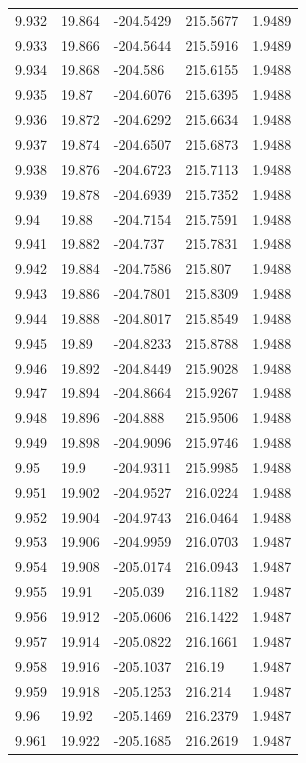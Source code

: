 \begin{tabular}{lllll}
9.932 & 19.864 & -204.5429 & 215.5677 & 1.9489 \\
9.933 & 19.866 & -204.5644 & 215.5916 & 1.9489 \\
9.934 & 19.868 & -204.586 & 215.6155 & 1.9488 \\
9.935 & 19.87 & -204.6076 & 215.6395 & 1.9488 \\
9.936 & 19.872 & -204.6292 & 215.6634 & 1.9488 \\
9.937 & 19.874 & -204.6507 & 215.6873 & 1.9488 \\
9.938 & 19.876 & -204.6723 & 215.7113 & 1.9488 \\
9.939 & 19.878 & -204.6939 & 215.7352 & 1.9488 \\
9.94 & 19.88 & -204.7154 & 215.7591 & 1.9488 \\
9.941 & 19.882 & -204.737 & 215.7831 & 1.9488 \\
9.942 & 19.884 & -204.7586 & 215.807 & 1.9488 \\
9.943 & 19.886 & -204.7801 & 215.8309 & 1.9488 \\
9.944 & 19.888 & -204.8017 & 215.8549 & 1.9488 \\
9.945 & 19.89 & -204.8233 & 215.8788 & 1.9488 \\
9.946 & 19.892 & -204.8449 & 215.9028 & 1.9488 \\
9.947 & 19.894 & -204.8664 & 215.9267 & 1.9488 \\
9.948 & 19.896 & -204.888 & 215.9506 & 1.9488 \\
9.949 & 19.898 & -204.9096 & 215.9746 & 1.9488 \\
9.95 & 19.9 & -204.9311 & 215.9985 & 1.9488 \\
9.951 & 19.902 & -204.9527 & 216.0224 & 1.9488 \\
9.952 & 19.904 & -204.9743 & 216.0464 & 1.9488 \\
9.953 & 19.906 & -204.9959 & 216.0703 & 1.9487 \\
9.954 & 19.908 & -205.0174 & 216.0943 & 1.9487 \\
9.955 & 19.91 & -205.039 & 216.1182 & 1.9487 \\
9.956 & 19.912 & -205.0606 & 216.1422 & 1.9487 \\
9.957 & 19.914 & -205.0822 & 216.1661 & 1.9487 \\
9.958 & 19.916 & -205.1037 & 216.19 & 1.9487 \\
9.959 & 19.918 & -205.1253 & 216.214 & 1.9487 \\
9.96 & 19.92 & -205.1469 & 216.2379 & 1.9487 \\
9.961 & 19.922 & -205.1685 & 216.2619 & 1.9487 \\

\end{tabular}
